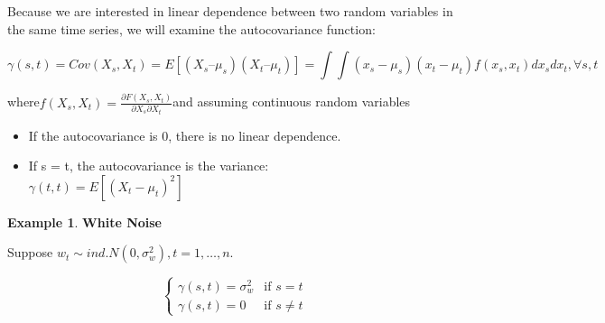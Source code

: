 \documentclass[
]{book}
\providecommand{\tightlist}{%
  \setlength{\itemsep}{0pt}\setlength{\parskip}{0pt}}
\theoremstyle{definition}
\theoremstyle{definition}
\newtheorem{example}{Example}[chapter]
\theoremstyle{definition}
\theoremstyle{definition}
\theoremstyle{remark}
\begin{document}
Because we are interested in linear dependence between two random variables in the same time series, we will examine the autocovariance function:

\[\gamma (s,t)  = Cov(X_s, X_t)
= E[(X_s – \mu_s)(X_t – \mu_t)]=
\int\int(x_s-\mu_s)(x_t-\mu_t)f(x_s,x_t)dx_sdx_t ,\forall s, t \]

where\(f(X_s,X_t)=\frac{\partial{F(X_s,X_t)}}{\partial{X_s}\partial{X_t}}\)and assuming continuous random variables

\begin{itemize}
\tightlist
\item
  If the autocovariance is 0, there is no linear dependence.\\
\item
  If s = t, the autocovariance is the variance:\\
  \(\gamma (t,t) = E[(X_t-\mu_t)^2]\)
\end{itemize}

\begin{example}
\textbf{White Noise}

Suppose \(w_t \sim ind. N(0,\sigma^2_w ), t=1,…,n.\)

\[\begin{cases}
  \gamma(s,t)=\sigma^2_w  & \text{if } s=t \\
  \gamma(s,t)= 0  & \text{if } s\ne t
\end{cases}\]
\end{example}
\end{document}
